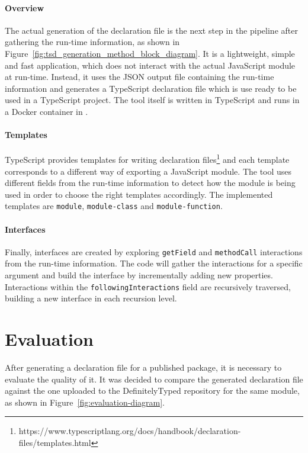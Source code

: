\documentclass[a4paper,english,cleveref, autoref]{lipics-v2019}
\newcommand{\figref}[1]{Figure~\ref{#1}}
\begin{document}
\paragraph*{Overview}
The actual generation of the declaration file is the next step in the
pipeline after gathering the run-time information, as shown in
\figref{fig:tsd_generation_method_block_diagram}. It is a lightweight,
simple and fast application, which does not interact with the actual
JavaScript module at run-time. Instead, it uses the JSON output file
containing the run-time information and generates a TypeScript
declaration file which is use ready to be used in a TypeScript
project. The tool itself is written in TypeScript and runs in a
Docker container in \NodeJS.  

\paragraph*{Templates}
TypeScript provides templates for writing declaration files\footnote{https://www.typescriptlang.org/docs/handbook/declaration-files/templates.html} and each template corresponds to a different way of exporting a JavaScript module. The tool uses different fields from the run-time information to detect how the module is being used in order to choose the right templates accordingly. The implemented templates are \lstinline{module}, \lstinline{module-class} and \lstinline{module-function}.

\paragraph*{Interfaces}
Finally, interfaces are created by exploring \lstinline{getField} and \lstinline{methodCall} interactions from the run-time information. The code will gather the interactions for a specific argument and build the interface by incrementally adding new properties. Interactions within the \lstinline{followingInteractions} field are recursively traversed, building a new interface in each recursion level.

\section{Evaluation}
\label{sec:dts-generate-evaluation}
After generating a declaration file for a published \NPM{} package, it is necessary to evaluate the quality of it. It was decided to compare the generated declaration file against the one uploaded to the DefinitelyTyped repository for the same module, as shown in \figref{fig:evaluation-diagram}.
\end{document}
